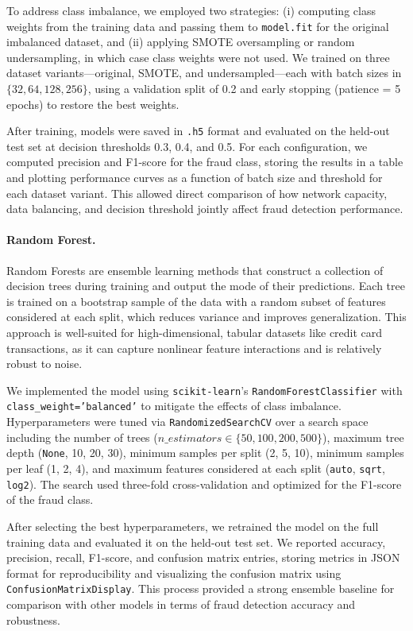 \documentclass{article}
\begin{document}
To address class imbalance, we employed two strategies: (i) computing class weights from the training data and passing them to \texttt{model.fit} for the original imbalanced dataset, and (ii) applying SMOTE oversampling or random undersampling, in which case class weights were not used. We trained on three dataset variants—original, SMOTE, and undersampled—each with batch sizes in $\{32, 64, 128, 256\}$, using a validation split of 0.2 and early stopping (patience = 5 epochs) to restore the best weights. 

After training, models were saved in \texttt{.h5} format and evaluated on the held-out test set at decision thresholds 0.3, 0.4, and 0.5. For each configuration, we computed precision and F1-score for the fraud class, storing the results in a table and plotting performance curves as a function of batch size and threshold for each dataset variant. This allowed direct comparison of how network capacity, data balancing, and decision threshold jointly affect fraud detection performance.

    \paragraph{Random Forest.}
Random Forests are ensemble learning methods that construct a collection of decision trees during training and output the mode of their predictions. Each tree is trained on a bootstrap sample of the data with a random subset of features considered at each split, which reduces variance and improves generalization. This approach is well-suited for high-dimensional, tabular datasets like credit card transactions, as it can capture nonlinear feature interactions and is relatively robust to noise.

We implemented the model using \texttt{scikit-learn}'s \texttt{RandomForestClassifier} with \texttt{class\_weight='balanced'} to mitigate the effects of class imbalance. Hyperparameters were tuned via \texttt{RandomizedSearchCV} over a search space including the number of trees ($n\_estimators \in \{50, 100, 200, 500\}$), maximum tree depth (\texttt{None}, 10, 20, 30), minimum samples per split (2, 5, 10), minimum samples per leaf (1, 2, 4), and maximum features considered at each split (\texttt{auto}, \texttt{sqrt}, \texttt{log2}). The search used three-fold cross-validation and optimized for the F1-score of the fraud class.

After selecting the best hyperparameters, we retrained the model on the full training data and evaluated it on the held-out test set. We reported accuracy, precision, recall, F1-score, and confusion matrix entries, storing metrics in JSON format for reproducibility and visualizing the confusion matrix using \texttt{ConfusionMatrixDisplay}. This process provided a strong ensemble baseline for comparison with other models in terms of fraud detection accuracy and robustness.
\end{document}
